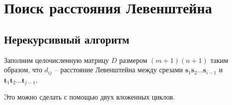 \documentclass{report}
\begin{document}
\section{Поиск расстояния Левенштейна}

\subsection{Нерекурсивный алгоритм} \label{design-vl-iterative}

Заполним целочисленную матрицу $D$ размером $(m + 1)(n + 1)$ таким
образом, что $d_{ij}$ -- расстояние Левенштейна между срезами
$\textbf{s}_1 \textbf{s}_2 ... \textbf{s}_{i - 1}$ и
$\textbf{t}_1 \textbf{t}_2 ... \textbf{t}_{j - 1}$.

Это можно сделать с помощью двух вложенных циклов.
\end{document}
